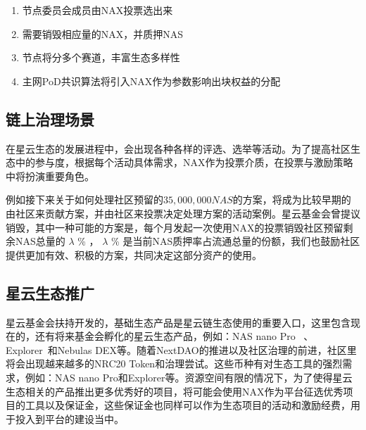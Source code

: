 \begin{enumerate}[\hspace{1cm}(a)]
  \item 节点委员会成员由NAX投票选出来
  \item 需要销毁相应量的NAX，并质押NAS
  \item 节点将分多个赛道，丰富生态多样性
  \item 主网PoD共识算法将引入NAX作为参数影响出块权益的分配
\end{enumerate}

\subsection{链上治理场景}
在星云生态的发展进程中，会出现各种各样的评选、选举等活动。为了提高社区生态中的参与度，根据每个活动具体需求，NAX作为投票介质，在投票与激励策略中将扮演重要角色。

例如接下来关于如何处理社区预留的$35,000,000NAS$的方案，将成为比较早期的由社区来贡献方案，并由社区来投票决定处理方案的活动案例。星云基金会曾提议销毁，其中一种可能的方案是，每个月发起一次使用NAX的投票销毁社区预留剩余NAS总量的 \(\lambda\) \% ， \(\lambda\) \% 是当前NAS质押率占流通总量的份额，我们也鼓励社区提供更加有效、积极的方案，共同决定这部分资产的使用。

\subsection{星云生态推广}
星云基金会扶持开发的，基础生态产品是星云链生态使用的重要入口，这里包含现在的，还有将来基金会孵化的星云生态产品，例如：NAS nano Pro~\cite{NASnano} 、Explorer~\cite{explorer}和Nebulas DEX等。随着NextDAO的推进以及社区治理的前进，社区里将会出现越来越多的NRC20 Token和治理尝试。这些币种有对生态工具的强烈需求，例如：NAS nano Pro和Explorer等。资源空间有限的情况下，为了使得星云生态相关的产品推出更多优秀好的项目，将可能会使用NAX作为平台征选优秀项目的工具以及保证金，这些保证金也同样可以作为生态项目的活动和激励经费，用于投入到平台的建设当中。

